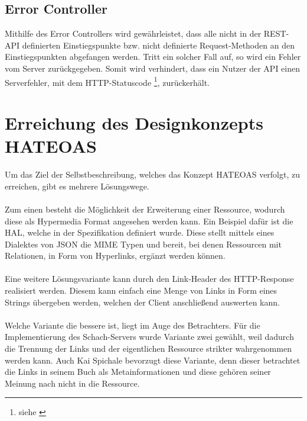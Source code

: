\subsection{Error Controller}\label{sec:errorController}
Mithilfe des Error Controllers wird gewährleistet, dass alle nicht in der \gls{REST}-\gls{API} definierten Einstiegspunkte bzw. nicht definierte Request-Methoden an den Einstiegspunkten abgefangen werden. Tritt ein solcher Fall auf, so wird ein Fehler vom Server zurückgegeben. Somit wird verhindert, dass ein Nutzer der \gls{API} einen Serverfehler, mit dem HTTP-Statuscode \footnote{siehe \cite[A.2.5]{kretzschmar}}, zurückerhält.

\section{Erreichung des Designkonzepts HATEOAS}\label{sec:konzeptHATEOAS}
Um das Ziel der Selbstbeschreibung, welches das Konzept HATEOAS verfolgt, zu erreichen, gibt es mehrere Lösungswege.\\
\\
Zum einen besteht die Möglichkeit der Erweiterung einer Ressource, wodurch diese als Hypermedia Format angesehen werden kann. Ein Beispiel dafür ist die \gls{HAL}, welche in der Spezifikation \cite{halSpezification} definiert wurde. Diese stellt mittels eines Dialektes von \gls{JSON} die \gls{MIME} Typen  und  bereit, bei denen Ressourcen mit Relationen, in Form von Hyperlinks, ergänzt werden können.\\
\\
Eine weitere Lösungsvariante kann durch den Link-Header des \gls{HTTP}-Response realisiert werden. Diesem kann einfach eine Menge von Links in Form eines Strings übergeben werden, welchen der Client anschließend auswerten kann.\\
\\
Welche Variante die bessere ist, liegt im Auge des Betrachters. Für die Implementierung des Schach-Servers wurde Variante zwei gewählt, weil dadurch die Trennung der Links und der eigentlichen Ressource strikter wahrgenommen werden kann. Auch Kai Spichale bevorzugt diese Variante, denn dieser betrachtet die Links in seinem Buch \cite[158]{apiDesign} als Metainformationen und diese gehören seiner Meinung nach nicht in die Ressource.